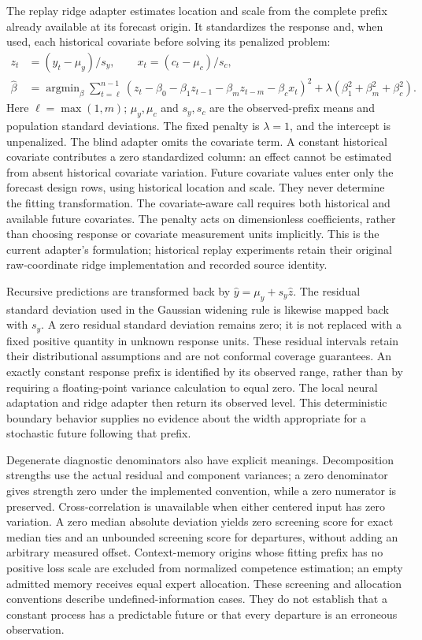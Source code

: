 The replay ridge adapter estimates location and scale from the complete prefix already available at its forecast origin. It standardizes the response and, when used, each historical covariate before solving its penalized problem:
\begin{align}
z_t&=(y_t-\mu_y)/s_y,\qquad x_t=(c_t-\mu_c)/s_c,\\
\widehat\beta&=\mathop{\arg\min}_{\beta}
\sum_{t=\ell}^{n-1}\left(z_t-\beta_0-\beta_1z_{t-1}-\beta_mz_{t-m}-\beta_cx_t\right)^2
+\lambda\left(\beta_1^2+\beta_m^2+\beta_c^2\right).
\end{align}
Here \(\ell=\max(1,m)\); \(\mu_y,\mu_c\) and \(s_y,s_c\) are the observed-prefix means and population standard deviations. The fixed penalty is \(\lambda=1\), and the intercept is unpenalized. The blind adapter omits the covariate term. A constant historical covariate contributes a zero standardized column: an effect cannot be estimated from absent historical covariate variation. Future covariate values enter only the forecast design rows, using historical location and scale. They never determine the fitting transformation. The covariate-aware call requires both historical and available future covariates. The penalty acts on dimensionless coefficients, rather than choosing response or covariate measurement units implicitly. This is the current adapter's formulation; historical replay experiments retain their original raw-coordinate ridge implementation and recorded source identity.

Recursive predictions are transformed back by \(\widehat y=\mu_y+s_y\widehat z\). The residual standard deviation used in the Gaussian widening rule is likewise mapped back with \(s_y\). A zero residual standard deviation remains zero; it is not replaced with a fixed positive quantity in unknown response units. These residual intervals retain their distributional assumptions and are not conformal coverage guarantees. An exactly constant response prefix is identified by its observed range, rather than by requiring a floating-point variance calculation to equal zero. The local neural adaptation and ridge adapter then return its observed level. This deterministic boundary behavior supplies no evidence about the width appropriate for a stochastic future following that prefix.

Degenerate diagnostic denominators also have explicit meanings. Decomposition strengths use the actual residual and component variances; a zero denominator gives strength zero under the implemented convention, while a zero numerator is preserved. Cross-correlation is unavailable when either centered input has zero variation. A zero median absolute deviation yields zero screening score for exact median ties and an unbounded screening score for departures, without adding an arbitrary measured offset. Context-memory origins whose fitting prefix has no positive loss scale are excluded from normalized competence estimation; an empty admitted memory receives equal expert allocation. These screening and allocation conventions describe undefined-information cases. They do not establish that a constant process has a predictable future or that every departure is an erroneous observation.

